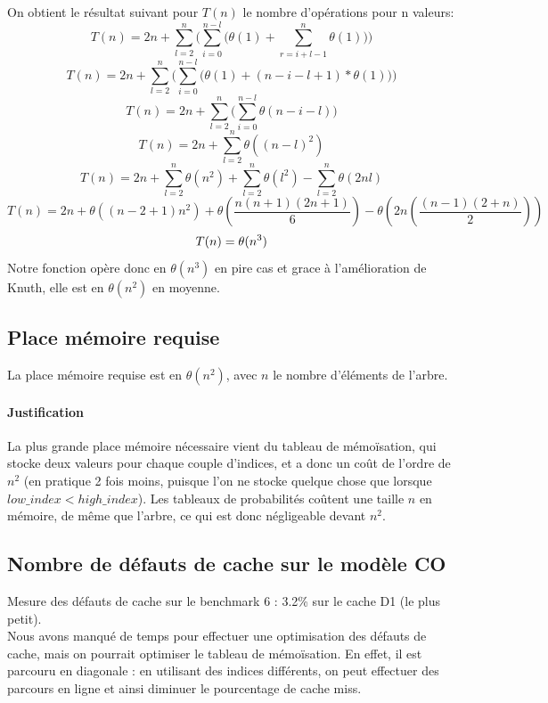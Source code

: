 \documentclass[a4paper, 10pt, french]{article}
\begin{document}
	{On obtient le résultat suivant pour $T(n)$ le nombre d'opérations pour n valeurs:}
	\[ 
		T(n) = 2n + \sum_{l=2}^{n}{\Bigg(\sum_{i=0}^{n-l}{\bigg(\theta(1)+\sum_{r=i+l-1}^{n}{\theta(1)\bigg)\Bigg)}}}
	\]
	\[
		T(n) = 2n + \sum_{l=2}^{n}{\Bigg(\sum_{i=0}^{n-l}{\bigg(\theta(1)+(n-i-l+1)*\theta(1)\bigg)\Bigg)}}
	\]
	\[
		T(n) = 2n + \sum_{l=2}^{n}{\Bigg(\sum_{i=0}^{n-l}{\theta(n-i-l)\Bigg)}}
	\]
	\[
		T(n) = 2n + \sum_{l=2}^{n}{\theta((n-l)^{2})}
	\]
	\[
		T(n) = 2n + \sum_{l=2}^{n}{\theta(n^2)} + \sum_{l=2}^{n}{\theta(l^2)} -\sum_{l=2}^{n}{\theta(2nl)}
	\]
	\[
		T(n) = 2n + \theta((n-2+1)n^2) + \theta(\frac{n(n+1)(2n+1)}{6}) -\theta(2n(\frac{(n-1)(2+n)}{2}))
	\]
	\[
		T(n) = \theta(n^3)\\
	\]
	{Notre fonction opère donc en $\theta(n^3)$ en pire cas et grace à l'amélioration de Knuth, elle est en $\theta(n^2)$ en moyenne.}\\

  \subsection{Place mémoire requise}
  La place mémoire requise est en $\theta(n^2)$, avec $n$ le nombre d'éléments de l'arbre.
	\paragraph{Justification}
	La plus grande place mémoire nécessaire vient du tableau de mémoïsation, qui stocke deux valeurs pour chaque couple d'indices, et a donc un coût de l'ordre de $n^2$ (en pratique 2 fois moins, puisque l'on ne stocke quelque chose que lorsque $low\_index < high\_index$).
	Les tableaux de probabilités coûtent une taille $n$ en mémoire, de même que l'arbre, ce qui est donc négligeable devant $n^2$.

  \subsection{Nombre de défauts de cache sur le modèle CO}
	Mesure des défauts de cache sur le benchmark 6 : 3.2\% sur le cache D1 (le plus petit). \\

	Nous avons manqué de temps pour effectuer une optimisation des défauts de cache, mais on pourrait optimiser le tableau de mémoïsation. 
	En effet, il est parcouru en diagonale : en utilisant des indices différents, on peut effectuer des parcours en ligne et ainsi diminuer le pourcentage de cache miss.
\end{document}
